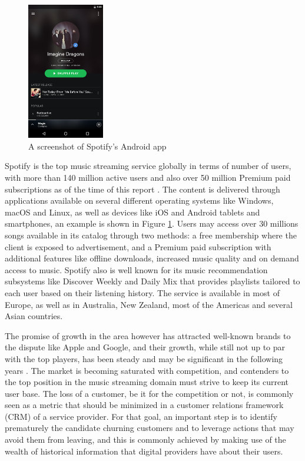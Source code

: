 \documentclass{kththesis}
\begin{document}
	\begin{figure}[h]
    \centering
    \includegraphics[width=0.3\textwidth, natwidth=506bp, natheight=900bp]{figures/spotify_screenshot.png}
    \caption{A screenshot of Spotify's Android app}
    \label{fig:spotify-screenshot}
\end{figure}
		
	Spotify is the top music streaming service globally in terms of number of users, with more than 140 million active users and also over 50 million Premium paid subscriptions as of the time of this report \citep{spotifypress}. The content is delivered through applications available on several different operating systems like Windows, macOS and Linux, as well as devices like iOS and Android tablets and smartphones, an example is shown in Figure \ref{fig:spotify-screenshot}. Users may access over 30 millions songs available in its catalog through two methods: a free membership where the client is exposed to advertisement, and a Premium paid subscription with additional features like offline downloads, increased music quality and on demand access to music. Spotify also is well known for its music recommendation subsystems like Discover Weekly and Daily Mix that provides playlists tailored to each user based on their listening history. The service is available in most of Europe, as well as in Australia, New Zealand, most of the Americas and several Asian countries.	
	
	The promise of growth in the area however has attracted well-known brands to the dispute like Apple and Google, and their growth, while still not up to par with the top players, has been steady and may be significant in the following years \citep{ifpi}. The market is becoming saturated with competition, and contenders to the top position in the music streaming domain must strive to keep its current user base. The loss of a customer, be it for the competition or not, is commonly seen as a metric that should be minimized in a customer relations framework (CRM) of a service provider. For that goal, an important step is to identify prematurely the candidate churning customers and to leverage actions that may avoid them from leaving, and this is commonly achieved by making use of the wealth of historical information that digital providers have about their users. 
	  
\end{document}
